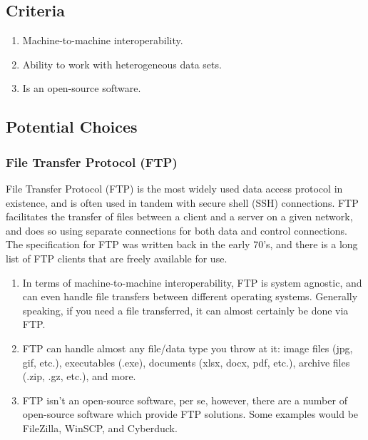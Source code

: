 \documentclass[onecolumn, draftclsnofoot,10pt, compsoc]{IEEEtran}
\begin{document}
\subsection{Criteria}
\begin{enumerate}
\item Machine-to-machine interoperability.
\item Ability to work with heterogeneous data sets.
\item Is an open-source software.
\end{enumerate}
\subsection{Potential Choices}

\subsubsection{File Transfer Protocol (FTP)}
File Transfer Protocol (FTP) is the most widely used data access protocol in existence, and is often used in tandem with secure shell (SSH) connections. FTP facilitates the transfer of files between a client and a server on a given network, and does so using separate connections for both data and control connections. The specification for FTP was written back in the early 70's, and there is a long list of FTP clients that are freely available for use. 

\begin{enumerate}
\item In terms of machine-to-machine interoperability, FTP is system agnostic, and can even handle file transfers between different operating systems. Generally speaking, if you need a file transferred, it can almost certainly be done via FTP.
\item FTP can handle almost any file/data type you throw at it: image files (jpg, gif, etc.), executables (.exe), documents (xlsx, docx, pdf, etc.), archive files (.zip, .gz, etc.), and more.
\item FTP isn’t an open-source software, per se, however, there are a number of open-source software which provide FTP solutions. Some examples would be FileZilla, WinSCP, and Cyberduck.
\end{enumerate}
\end{document}
